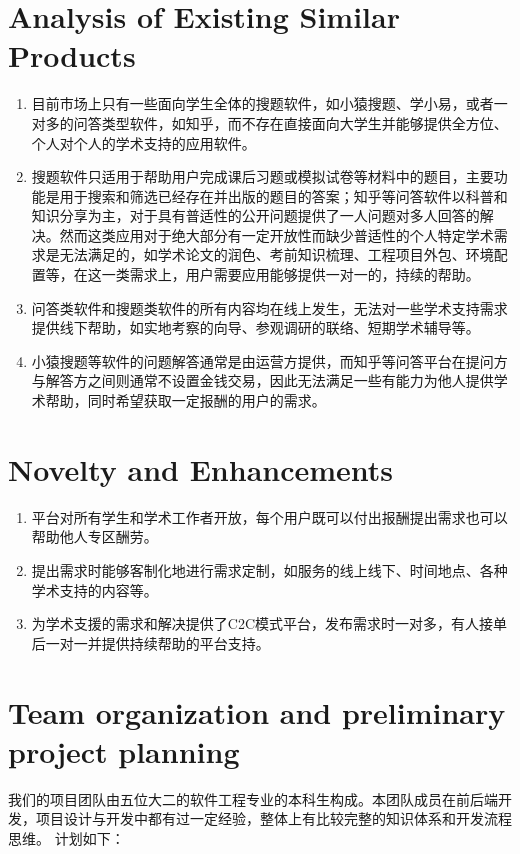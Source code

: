 \documentclass[cn,black,10pt,normal]{elegantnote}
\begin{document}
\section{Analysis of Existing Similar Products}

\begin{enumerate}
    \item 目前市场上只有一些面向学生全体的搜题软件，如小猿搜题、学小易，或者一对多的问答类型软件，如知乎，而不存在直接面向大学生并能够提供全方位、个人对个人的学术支持的应用软件。
    \item 搜题软件只适用于帮助用户完成课后习题或模拟试卷等材料中的题目，主要功能是用于搜索和筛选已经存在并出版的题目的答案；知乎等问答软件以科普和知识分享为主，对于具有普适性的公开问题提供了一人问题对多人回答的解决。然而这类应用对于绝大部分有一定开放性而缺少普适性的个人特定学术需求是无法满足的，如学术论文的润色、考前知识梳理、工程项目外包、环境配置等，在这一类需求上，用户需要应用能够提供一对一的，持续的帮助。
    \item 问答类软件和搜题类软件的所有内容均在线上发生，无法对一些学术支持需求提供线下帮助，如实地考察的向导、参观调研的联络、短期学术辅导等。
    \item 小猿搜题等软件的问题解答通常是由运营方提供，而知乎等问答平台在提问方与解答方之间则通常不设置金钱交易，因此无法满足一些有能力为他人提供学术帮助，同时希望获取一定报酬的用户的需求。
\end{enumerate}

\section{Novelty and Enhancements}

\begin{enumerate}
    \item 平台对所有学生和学术工作者开放，每个用户既可以付出报酬提出需求也可以帮助他人专区酬劳。
    \item 提出需求时能够客制化地进行需求定制，如服务的线上线下、时间地点、各种学术支持的内容等。
    \item 为学术支援的需求和解决提供了C2C模式平台，发布需求时一对多，有人接单后一对一并提供持续帮助的平台支持。
\end{enumerate}

\section{Team organization and preliminary project planning}

我们的项目团队由五位大二的软件工程专业的本科生构成。本团队成员在前后端开发，项目设计与开发中都有过一定经验，整体上有比较完整的知识体系和开发流程思维。
计划如下：
\end{document}
